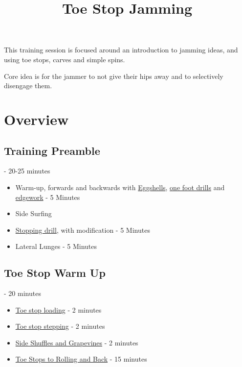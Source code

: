 \documentclass{journal}
\title{Toe Stop Jamming}
\author{}
\begin{document}
\maketitle
\noindent 

This training session is focused around an introduction to jamming ideas, and using toe stops, carves and simple spins.   

Core idea is for the jammer to not give their hips away and to selectively disengage them.

\section*{Overview}

\subsection*{Training Preamble} - 20-25 minutes
\begin{itemize}
\item Warm-up, forwards and backwards with \hyperref[drill:sticky:eggshells]{Eggshells}, \hyperref[drill:one_foot:serpentine]{one foot drills} and  \hyperref[drill:carves_and_weaves]{edgework} - 5 Minutes
\item Side Surfing
\item \hyperref[drill:stopping:jackie_daniels]{Stopping drill}, with modification - 5 Minutes 
\item Lateral Lunges - 5 Minutes 
\end{itemize}


\subsection*{Toe Stop Warm Up} - 20 minutes
\begin{itemize}
    \item \hyperref[drill:toe_stop:loading]{Toe stop loading} - 2 minutes
    \item \hyperref[drill:toe_stop:stepping]{Toe stop stepping} - 2 minutes
    \item \hyperref[drill:toe_stop:side_shuffles]{Side Shuffles and Grapevines} - 2 minutes
    \item \hyperref[drill:side_rolling]{Toe Stops to Rolling and Back} - 15 minutes
\end{itemize}
\end{document}
